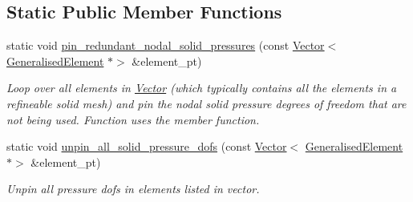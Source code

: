 \subsection*{Static Public Member Functions}
\begin{DoxyCompactItemize}
\item 
static void \hyperlink{classoomph_1_1PVDEquationsBase_a055460413e57cf52649c4db96f50f5c1}{pin\+\_\+redundant\+\_\+nodal\+\_\+solid\+\_\+pressures} (const \hyperlink{classoomph_1_1Vector}{Vector}$<$ \hyperlink{classoomph_1_1GeneralisedElement}{Generalised\+Element} $\ast$$>$ \&element\+\_\+pt)
\begin{DoxyCompactList}\small\item\em Loop over all elements in \hyperlink{classoomph_1_1Vector}{Vector} (which typically contains all the elements in a refineable solid mesh) and pin the nodal solid pressure degrees of freedom that are not being used. Function uses the member function. \end{DoxyCompactList}\item 
static void \hyperlink{classoomph_1_1PVDEquationsBase_a7894dec52664b0c326b3af50dc7cd6f5}{unpin\+\_\+all\+\_\+solid\+\_\+pressure\+\_\+dofs} (const \hyperlink{classoomph_1_1Vector}{Vector}$<$ \hyperlink{classoomph_1_1GeneralisedElement}{Generalised\+Element} $\ast$$>$ \&element\+\_\+pt)
\begin{DoxyCompactList}\small\item\em Unpin all pressure dofs in elements listed in vector. \end{DoxyCompactList}\end{DoxyCompactItemize}
